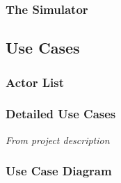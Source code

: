 \subsubsection{The Simulator}


\subsection{Use Cases}

\subsubsection{Actor List}

\subsubsection{Detailed Use Cases}
\textit{From project description}

\subsubsection{Use Case Diagram}

